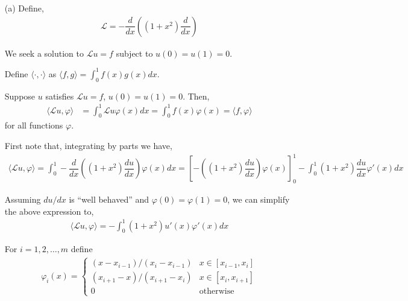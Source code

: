 \documentclass[10pt]{article}
\begin{document}
\begin{solution}[Solution]

\begin{enumerate}
    \item[(a)]
        Define,
        \begin{align*}
            \mathcal{L} = -\dfrac{d}{dx} \left( (1+x^2) \dfrac{d}{dx} \right)
        \end{align*}
        
        We seek a solution to \( \mathcal{L}u = f \) subject to \( u(0) = u(1) = 0 \).

        Define \( \langle\cdot,\cdot\rangle \) as \( \langle f,g\rangle = \int_{0}^{1}f(x)g(x)dx \).

       Suppose \( u \) satisfies \( \mathcal{L}u = f \), \( u(0) = u(1) = 0 \). Then,
        \begin{align*}
            \langle \mathcal{L}u, \varphi \rangle &= \int_{0}^{1}\mathcal{L}u \varphi(x) dx
            = \int_{0}^{1}f(x)\varphi(x) = \langle f,\varphi \rangle
        \end{align*}
        for all functions \( \varphi \).

        First note that, integrating by parts we have,
        \begin{align*}
            \langle \mathcal{L}u,\varphi\rangle = \int_{0}^{1} - \dfrac{d}{dx} \left( (1+x^2) \dfrac{du}{dx} \right)\varphi(x)dx = \left[ - \left( (1+x^2) \dfrac{du}{dx} \right)\varphi(x) \right]_0^1 - \int_{0}^{1}(1+x^2) \dfrac{du}{dx} \varphi'(x) dx
        \end{align*}
        
        Assuming \( du/dx \) is ``well behaved'' and \( \varphi(0) = \varphi(1) = 0 \), we can simplify the above expression to,
        \begin{align*}
            \langle \mathcal{L} u,\varphi \rangle  = -\int_{0}^{1}(1+x^2) u'(x)\varphi'(x) dx
        \end{align*}
        

        For \( i=1,2,\ldots, m \) define
        \begin{align*}
            \varphi_i(x) = \begin{cases}
                (x-x_{i-1})/(x_i-x_{i-1}) & x\in[x_{i-1},x_i] \\
                (x_{i+1}-x)/(x_{i+1}-x_i) & x\in[x_i,x_{i+1}] \\
                0 & \text{otherwise}
            \end{cases}            
        \end{align*}


\end{enumerate}
\end{solution}
\end{document}
